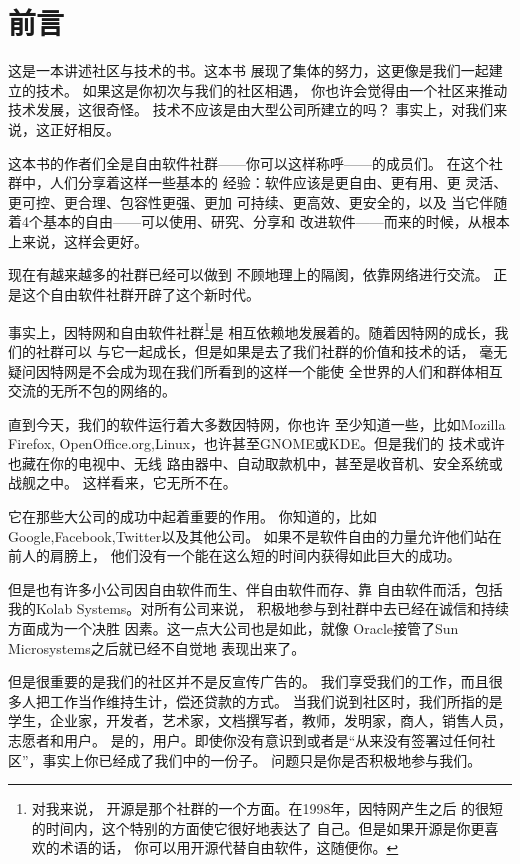 ﻿\section*{前言}

这是一本讲述社区与技术的书。这本书
展现了集体的努力，这更像是我们一起建立的技术。
如果这是你初次与我们的社区相遇，
你也许会觉得由一个社区来推动技术发展，这很奇怪。
技术不应该是由大型公司所建立的吗？
事实上，对我们来说，这正好相反。

这本书的作者们全是自由软件社群——你可以这样称呼——的成员们。
在这个社群中，人们分享着这样一些基本的
经验：软件应该是更自由、更有用、更
灵活、更可控、更合理、包容性更强、更加
可持续、更高效、更安全的，以及
当它伴随着4个基本的自由——可以使用、研究、分享和
改进软件——而来的时候，从根本上来说，这样会更好。

现在有越来越多的社群已经可以做到
不顾地理上的隔阂，依靠网络进行交流。
正是这个自由软件社群开辟了这个新时代。

事实上，因特网和自由软件社群\footnote{对我来说，
  开源是那个社群的一个方面。在1998年，因特网产生之后
  的很短的时间内，这个特别的方面使它很好地表达了
  自己。但是如果开源是你更喜欢的术语的话，
  你可以用开源代替自由软件，这随便你。}是
相互依赖地发展着的。随着因特网的成长，我们的社群可以
与它一起成长，但是如果是去了我们社群的价值和技术的话，
毫无疑问因特网是不会成为现在我们所看到的这样一个能使
全世界的人们和群体相互交流的无所不包的网络的。

直到今天，我们的软件运行着大多数因特网，你也许
至少知道一些，比如Mozilla Firefox,
OpenOffice.org,Linux，也许甚至GNOME或KDE。但是我们的
技术或许也藏在你的电视中、无线
路由器中、自动取款机中，甚至是收音机、安全系统或战舰之中。
这样看来，它无所不在。

它在那些大公司的成功中起着重要的作用。
你知道的，比如Google,Facebook,Twitter以及其他公司。
如果不是软件自由的力量允许他们站在前人的肩膀上，
他们没有一个能在这么短的时间内获得如此巨大的成功。

但是也有许多小公司因自由软件而生、伴自由软件而存、靠
自由软件而活，包括我的Kolab Systems。对所有公司来说，
积极地参与到社群中去已经在诚信和持续方面成为一个决胜
因素。这一点大公司也是如此，就像
Oracle接管了Sun Microsystems之后就已经不自觉地
表现出来了。


但是很重要的是我们的社区并不是反宣传广告的。
我们享受我们的工作，而且很多人把工作当作维持生计，偿还贷款的方式。
当我们说到社区时，我们所指的是学生，企业家，开发者，艺术家，文档撰写者，教师，发明家，商人，销售人员，
志愿者和用户。
是的，用户。即使你没有意识到或者是“从来没有签署过任何社区”，事实上你已经成了我们中的一份子。
问题只是你是否积极地参与我们。

